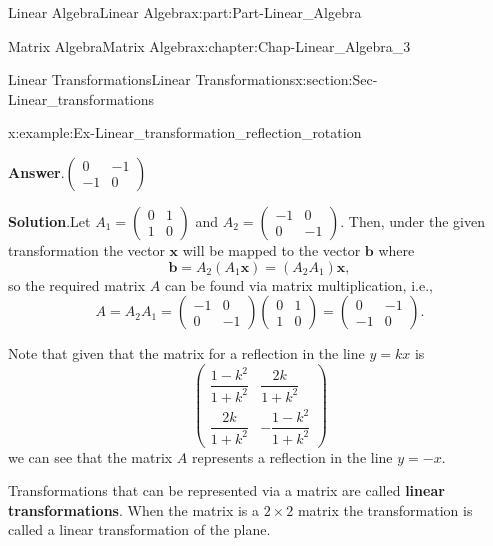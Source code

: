 \documentclass[oneside,10pt,]{book}
\newcommand{\blocktitlefont}{\relax}
\newcommand{\terminology}[1]{\textbf{#1}}
\numberwithin{equation}{section}
\newcommand{\amp}{&}
\begin{document}
\begin{partptx}{Linear Algebra}{}{Linear Algebra}{}{}{x:part:Part-Linear_Algebra}
\begin{chapterptx}{Matrix Algebra}{}{Matrix Algebra}{}{}{x:chapter:Chap-Linear_Algebra_3}
\begin{sectionptx}{Linear Transformations}{}{Linear Transformations}{}{}{x:section:Sec-Linear_transformations}
\begin{example}{}{x:example:Ex-Linear_transformation_reflection_rotation}
\par\smallskip%
\noindent\textbf{\blocktitlefont Answer}.\hypertarget{g:answer:id571222}{}\quad{}\(\begin{pmatrix} 0 \amp -1 \\ -1 \amp 0\end{pmatrix}\)\par\smallskip%
\noindent\textbf{\blocktitlefont Solution}.\hypertarget{g:solution:id571225}{}\quad{}Let \(A_1 = \begin{pmatrix} 0 \amp 1 \\ 1 \amp 0\end{pmatrix}\) and \(A_2 = \begin{pmatrix} -1 \amp 0 \\ 0 \amp -1 \end{pmatrix}.\) Then, under the given transformation the vector \(\mathbf{x}\) will be mapped to the vector \(\mathbf{b}\) where%
\begin{equation*}
\mathbf{b} = A_2(A_1 \mathbf{x}) = (A_2A_1)\mathbf{x},
\end{equation*}
so the required matrix \(A\) can be found via matrix multiplication, i.e.,%
\begin{equation*}
A = A_2A_1 =\begin{pmatrix} -1 \amp 0 \\ 0 \amp -1 \end{pmatrix} \begin{pmatrix} 0 \amp 1 \\ 1 \amp 0\end{pmatrix} = \begin{pmatrix} 0 \amp -1 \\ -1 \amp 0\end{pmatrix}.
\end{equation*}
%
\par
Note that given that the matrix for a reflection in the line \(y = kx\) is%
\begin{equation*}
\begin{pmatrix} \dfrac{1-k^2}{1+k^2} \amp \dfrac{2k}{1+k^2}\\ \dfrac{2k}{1+k^2} \amp -\dfrac{1-k^2}{1+k^2} \end{pmatrix}
\end{equation*}
we can see that the matrix \(A\) represents a reflection in the line \(y=-x\).%
\end{example}
Transformations that can be represented via a matrix are called \terminology{linear transformations}. When the matrix is a \(2 \times 2\) matrix the transformation is called a linear transformation of the plane.%

\end{sectionptx}
\end{chapterptx}
\end{partptx}
\end{document}
